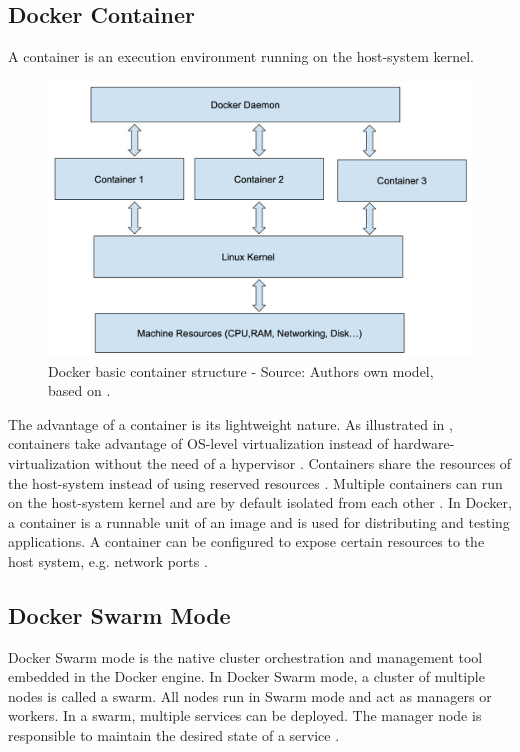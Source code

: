 

\subsection{Docker Container}
A container is an execution environment running on the host-system kernel.

\begin{figure}[h]
\centering
\includegraphics[scale=0.8]{images/04_technical_background/docker_basic_container_structure}
\caption{Docker basic container structure - Source: Authors own model, based on \cite{Bullington2020Docker}.}
\label{fig:docker_container_struct}
\end{figure}

The advantage of a container is its lightweight nature. As illustrated in , containers take advantage of OS-level virtualization instead of hardware-virtualization without the need of a hypervisor \cite{Docker2020Docs, Nickoloff2019Docker}. Containers share the resources of the host-system instead of using reserved resources \cite{Bullington2020Docker}. Multiple containers can run on the host-system kernel and are by default isolated from each other \cite{Docker2020Docs}.
In Docker, a container is a runnable unit of an image and is used for distributing and testing applications. A container can be configured to expose certain resources to the host system, e.g. network ports \cite{Bullington2020Docker}.


\subsection{Docker Swarm Mode}
Docker Swarm mode is the native cluster orchestration and management tool embedded in the Docker engine.
In Docker Swarm mode, a cluster of multiple nodes is called a swarm. All nodes run in Swarm mode and act as managers or workers.
In a swarm, multiple services can be deployed. The manager node is responsible to maintain the desired state of a service \cite{Docker2020Docs}.


